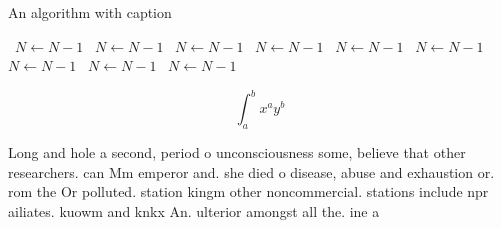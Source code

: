\documentclass[a4paper]{article}
\begin{document}
\begin{algorithm}
\caption{An algorithm with caption}
\begin{algorithmic}
\    \State $N \gets N - 1$
\    \State $N \gets N - 1$
\    \State $N \gets N - 1$
\    \State $N \gets N - 1$
\    \State $N \gets N - 1$
\    \State $N \gets N - 1$
\    \State $N \gets N - 1$
\    \State $N \gets N - 1$
\    \State $N \gets N - 1$
\EndWhile
\end{algorithmic}
\end{algorithm}

\[ \int_{a}^{b}{x^{a}y^{b}} \]

Long and hole a second, period o unconsciousness some, believe that other researchers. can Mm emperor and. she died o disease, abuse and exhaustion or. rom the Or polluted. station kingm other noncommercial. stations include npr ailiates. kuowm and knkx An. ulterior amongst all the. ine a
\end{document}
